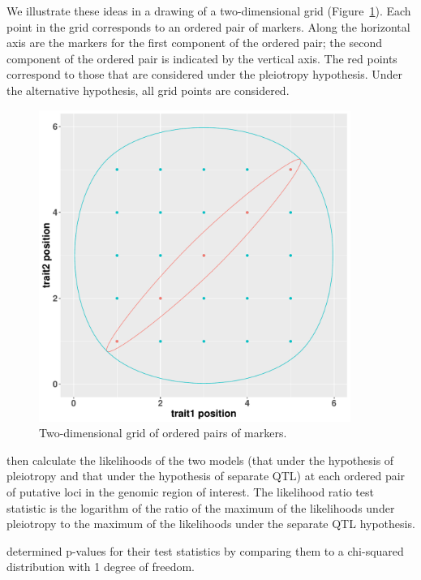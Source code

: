 \documentclass[oneside]{book}\usepackage[]{graphicx}\usepackage[]{color}
\newenvironment{knitrout}{}{} %
\begin{document}
We illustrate these ideas in a drawing of a two-dimensional grid (Figure~\ref{fig:encircle}). Each point in the grid corresponds to an ordered pair of markers. Along the horizontal axis are the markers for the first component of the ordered pair; the second component of the ordered pair is indicated by the vertical axis. The red points correspond to those that are considered under the pleiotropy hypothesis. Under the alternative hypothesis, all grid points are considered. 




\begin{knitrout}
\color{fgcolor}\begin{figure}
\includegraphics[width=4in,height=4in]{figure/encircle-1} \caption[Two-dimensional grid of ordered pairs of markers]{Two-dimensional grid of ordered pairs of markers.}\label{fig:encircle}
\end{figure}


\end{knitrout}



\citet{jiang1995multiple} then calculate the likelihoods of the two models
(that under the hypothesis of pleiotropy and that under the hypothesis of separate QTL)
at each ordered pair of putative loci in the genomic region of interest.
The likelihood ratio test statistic is the logarithm of the ratio of the maximum
of the likelihoods under pleiotropy to the maximum of the likelihoods under
the separate QTL hypothesis. 

\citet{jiang1995multiple} determined p-values for their test statistics by comparing
them to a chi-squared distribution with 1 degree of freedom. 
\end{document}
